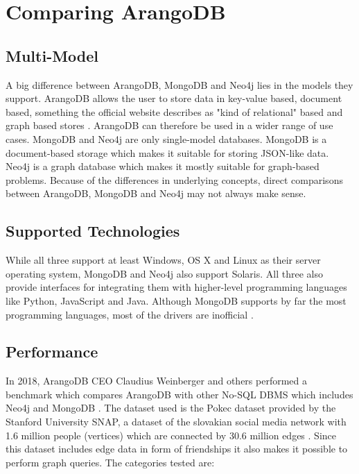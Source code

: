 \section{Comparing ArangoDB}

\subsection{Multi-Model}
A big difference between ArangoDB, MongoDB and Neo4j lies in the models they support. ArangoDB allows the user to store data in key-value based, document based, something the official website describes as "kind of relational" based and graph based stores \parencite{DBBenchmark}. ArangoDB can therefore be used in a wider range of use cases. MongoDB and Neo4j are only single-model databases. MongoDB is a document-based storage which makes it suitable for storing JSON-like data. Neo4j is a graph database which makes it mostly suitable for graph-based problems. Because of the differences in underlying concepts, direct comparisons between ArangoDB, MongoDB and Neo4j may not always make sense.

\subsection{Supported Technologies}

While all three support at least Windows, OS X and Linux as their server operating system, MongoDB and Neo4j also support Solaris. All three also provide interfaces for integrating them with higher-level programming languages like Python, JavaScript and Java. Although MongoDB supports by far the most programming languages, most of the drivers are inofficial \parencite{DBEnginesComparisons}.

\subsection{Performance}

In 2018, ArangoDB CEO Claudius Weinberger and others performed a benchmark which compares ArangoDB with other No-SQL DBMS which includes Neo4j and MongoDB \parencite{DBBenchmark}. The dataset used is the Pokec dataset provided by the Stanford University SNAP, a dataset of the slovakian social media network with 1.6 million people (vertices) which are connected by 30.6 million edges \parencite{Pokec}. Since this dataset includes edge data in form of friendships it also makes it possible to perform graph queries. The categories tested are:

